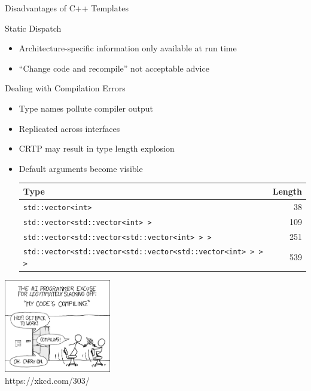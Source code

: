 

\begin{frame}[fragile]{Disadvantages of C++ Templates}

 \begin{block}{Static Dispatch}
  \begin{itemize}
   \item Architecture-specific information only available at run time
   \item ``Change code and recompile'' not acceptable advice
  \end{itemize}
 \end{block}

 \begin{block}{Dealing with Compilation Errors}
  \begin{itemize}
   \item Type names pollute compiler output
   \item Replicated across interfaces
   \item CRTP may result in type length explosion
   \item Default arguments become visible \\[0.5em]
\begin{tabular}{|l|r|}
 \hline
  Type   & Length \\ 
 \hline
 \lstinline|std::vector<int>|                                           &  38 \\
 \lstinline|std::vector<std::vector<int> >|                             & 109 \\
 \lstinline|std::vector<std::vector<std::vector<int> > >|               & 251 \\
 \lstinline|std::vector<std::vector<std::vector<std::vector<int> > > >| & 539 \\
 \hline
\end{tabular}
  \end{itemize}
 \end{block}

 \vspace*{-7.5cm}
 \begin{flushright}
  \includegraphics[width=0.35\textwidth]{figures/xkcd-compiling} \\
  {\scriptsize https://xkcd.com/303/}
 \end{flushright}
 \vspace*{2.5cm}

\end{frame}

